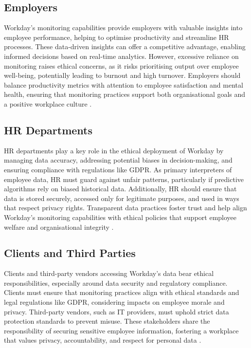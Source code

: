 \documentclass[a4paper]{article}
\begin{document}
\subsection{Employers}
Workday’s monitoring capabilities provide employers with valuable insights into employee performance, helping to optimise productivity and streamline HR processes. These data-driven insights can offer a competitive advantage, enabling informed decisions based on real-time analytics. However, excessive reliance on monitoring raises ethical concerns, as it risks prioritising output over employee well-being, potentially leading to burnout and high turnover. Employers should balance productivity metrics with attention to employee satisfaction and mental health, ensuring that monitoring practices support both organisational goals and a positive workplace culture \citep{Sewell2012}.

\subsection{HR Departments}
HR departments play a key role in the ethical deployment of Workday by managing data accuracy, addressing potential biases in decision-making, and ensuring compliance with regulations like GDPR. As primary interpreters of employee data, HR must guard against unfair patterns, particularly if predictive algorithms rely on biased historical data. Additionally, HR should ensure that data is stored securely, accessed only for legitimate purposes, and used in ways that respect privacy rights. Transparent data practices foster trust and help align Workday’s monitoring capabilities with ethical policies that support employee welfare and organisational integrity \citep{Alge2006}.

\subsection{Clients and Third Parties}
Clients and third-party vendors accessing Workday’s data bear ethical responsibilities, especially around data security and regulatory compliance. Clients must ensure that monitoring practices align with ethical standards and legal regulations like GDPR, considering impacts on employee morale and privacy. Third-party vendors, such as IT providers, must uphold strict data protection standards to prevent misuse. These stakeholders share the responsibility of securing sensitive employee information, fostering a workplace that values privacy, accountability, and respect for personal data \citep{Ajunwa2017}.
\end{document}
